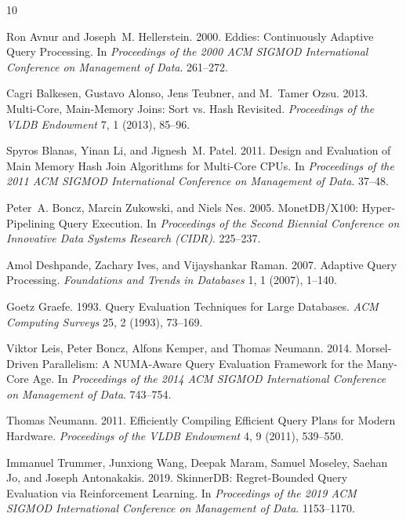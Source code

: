 \balance
\begin{thebibliography}{10}

Ron Avnur and Joseph~M. Hellerstein. 2000.
Eddies: Continuously Adaptive Query Processing.
In \emph{Proceedings of the 2000 ACM SIGMOD International Conference on
Management of Data}. 261--272.

Cagri Balkesen, Gustavo Alonso, Jens Teubner, and M.~Tamer Ozsu. 2013.
Multi-Core, Main-Memory Joins: Sort vs. Hash Revisited.
\emph{Proceedings of the VLDB Endowment} 7, 1 (2013), 85--96.

Spyros Blanas, Yinan Li, and Jignesh~M. Patel. 2011.
Design and Evaluation of Main Memory Hash Join Algorithms for Multi-Core CPUs.
In \emph{Proceedings of the 2011 ACM SIGMOD International Conference on
Management of Data}. 37--48.

Peter~A. Boncz, Marcin Zukowski, and Niels Nes. 2005.
MonetDB/X100: Hyper-Pipelining Query Execution.
In \emph{Proceedings of the Second Biennial Conference on Innovative Data
Systems Research (CIDR)}. 225--237.

Amol Deshpande, Zachary Ives, and Vijayshankar Raman. 2007.
Adaptive Query Processing.
\emph{Foundations and Trends in Databases} 1, 1 (2007), 1--140.

Goetz Graefe. 1993.
Query Evaluation Techniques for Large Databases.
\emph{ACM Computing Surveys} 25, 2 (1993), 73--169.

Viktor Leis, Peter Boncz, Alfons Kemper, and Thomas Neumann. 2014.
Morsel-Driven Parallelism: A NUMA-Aware Query Evaluation Framework for the
Many-Core Age.
In \emph{Proceedings of the 2014 ACM SIGMOD International Conference on
Management of Data}. 743--754.

Thomas Neumann. 2011.
Efficiently Compiling Efficient Query Plans for Modern Hardware.
\emph{Proceedings of the VLDB Endowment} 4, 9 (2011), 539--550.

Immanuel Trummer, Junxiong Wang, Deepak Maram, Samuel Moseley, Saehan Jo, and
Joseph Antonakakis. 2019.
SkinnerDB: Regret-Bounded Query Evaluation via Reinforcement Learning.
In \emph{Proceedings of the 2019 ACM SIGMOD International Conference on
Management of Data}. 1153--1170.

\end{thebibliography}

